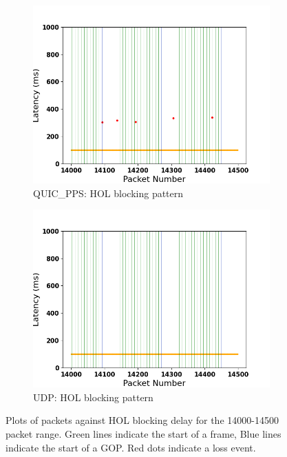 \documentclass{mpaper}
\begin{document}
\begin{figure}
\begin{subfigure}[b]{0.32\textwidth}
      \includegraphics[width=\textwidth]{SAL/QUIC_PPS_Stack_Latency_Available.png}
      \caption{QUIC\_PPS: HOL blocking pattern}
      \label{fig:PPSSA}
  \end{subfigure}
  \hfill
  \begin{subfigure}[b]{0.32\textwidth}
      \centering
      \includegraphics[width=\textwidth]{SAL/UDP_Stack_Latency_Available.png}
      \caption{UDP: HOL blocking pattern}
      \label{fig:USA}
  \end{subfigure}
     \vspace{0.1cm}
     \centering
     \caption{Plots of packets against HOL blocking delay for the 14000-14500 packet range. Green lines indicate the start of a frame, Blue lines indicate the start of a GOP. Red dots indicate a loss event.}
     \label{fig:SA}
\end{figure}
\end{document}
